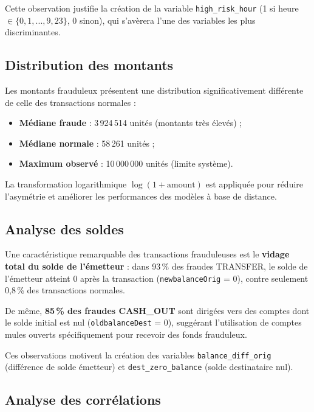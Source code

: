 \documentclass[12pt,a4paper,twoside]{report}
\theoremstyle{definition}
\begin{document}
Cette observation justifie la création de la variable \texttt{high\_risk\_hour}
(1 si heure $\in \{0,1,...,9,23\}$, 0 sinon), qui s'avèrera l'une des variables
les plus discriminantes.

\subsection{Distribution des montants}

Les montants frauduleux présentent une distribution significativement différente
de celle des transactions normales :

\begin{itemize}
  \item \textbf{Médiane fraude} : 3\,924\,514 unités (montants très élevés) ;
  \item \textbf{Médiane normale} : 58\,261 unités ;
  \item \textbf{Maximum observé} : 10\,000\,000 unités (limite système).
\end{itemize}

La transformation logarithmique $\log(1 + \text{amount})$ est appliquée pour
réduire l'asymétrie et améliorer les performances des modèles à base de distance.

\subsection{Analyse des soldes}

Une caractéristique remarquable des transactions frauduleuses est le
\textbf{vidage total du solde de l'émetteur} : dans 93\,\% des fraudes TRANSFER,
le solde de l'émetteur atteint 0 après la transaction
(\texttt{newbalanceOrig} = 0), contre seulement 0,8\,\% des transactions normales.

De même, \textbf{85\,\% des fraudes CASH\_OUT} sont dirigées vers des comptes dont
le solde initial est nul (\texttt{oldbalanceDest} = 0), suggérant l'utilisation
de comptes mules ouverts spécifiquement pour recevoir des fonds frauduleux.

Ces observations motivent la création des variables \texttt{balance\_diff\_orig}
(différence de solde émetteur) et \texttt{dest\_zero\_balance} (solde destinataire nul).

\subsection{Analyse des corrélations}
\end{document}
